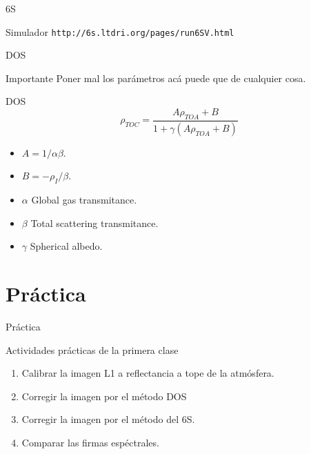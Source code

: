 \documentclass[handout]{beamer}
\begin{document}
\begin{frame}{6S}
  \begin{block}{Simulador}
    \texttt{http://6s.ltdri.org/pages/run6SV.html}
  \end{block}
\end{frame}

\begin{frame}{DOS}
  \begin{alertblock}{Importante}
    Poner mal los parámetros acá puede que de cualquier cosa.
  \end{alertblock}
\end{frame}

\begin{frame}{DOS}
  \begin{equation}
    \rho_{TOC} = \frac{A\rho_{TOA} + B }{1 + \gamma (A\rho_{TOA}+B)}
  \end{equation}\pause
  \begin{itemize}
    \item $A = 1/\alpha\beta$.
    \item $B = -\rho_I/\beta$.
    \item $\alpha$ Global gas transmitance.
    \item $\beta$ Total scattering transmitance.
    \item $\gamma$ Spherical albedo.
  \end{itemize}
\end{frame}
\section{Práctica}

\begin{frame}{Práctica}
  \begin{exampleblock}{Actividades prácticas de la primera clase}
    \begin{enumerate}
      \item Calibrar la imagen L1 a reflectancia a tope de la atmósfera.
      \item Corregir la imagen por el método DOS
      \item Corregir la imagen por el método del 6S.
      \item Comparar las firmas espéctrales.
    \end{enumerate}
  \end{exampleblock}
\end{frame}
\end{document}
